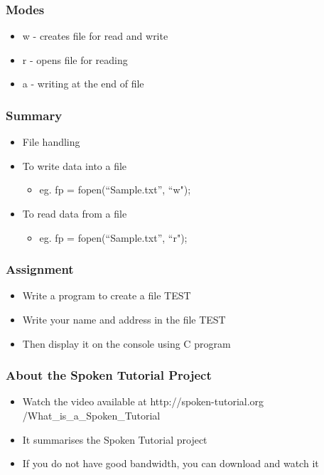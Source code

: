 \documentclass[17pt]{beamer}
\begin{document}
  \begin{frame}
  \frametitle{Modes}\pause
  \begin{itemize}[<+-|alert@+>]
 \item {\color{magenta}w} - creates file for read and write
 \item {\color{magenta}r} - opens file for reading
 \item {\color{magenta}a} - writing at the end of file
  \end{itemize}
  \end{frame}


\begin{frame}
\frametitle{Summary}
\begin{itemize}
\item File handling \vspace{0.30cm}
\item To write data into a file \vspace{0.30cm}
\begin{itemize}
\item eg. fp = fopen(``Sample.txt”, ``w"); \vspace{0.30cm}
\end{itemize}
\item To read data from a file \vspace{0.30cm}
\begin{itemize}
\item eg. fp = fopen(``Sample.txt”, ``r"); \vspace{0.30cm}
\end{itemize}
\end{itemize}
\end{frame}

\begin{frame} 
\frametitle{Assignment}
\begin{itemize}
\item Write a program to create a file TEST
\item Write your name and address in the file TEST
\item Then display it on the console using C program
\end{itemize}
\end{frame}

\begin{frame}
\frametitle{About the Spoken Tutorial Project}
\begin{itemize}
\item Watch the video available at {\color{blue} http://spoken-tutorial.org /What\_is\_a\_Spoken\_Tutorial} 
\item It summarises the Spoken Tutorial project 
\item If you do not have good bandwidth, you can download and watch it
\end{itemize}
\end{frame}
\end{document}
